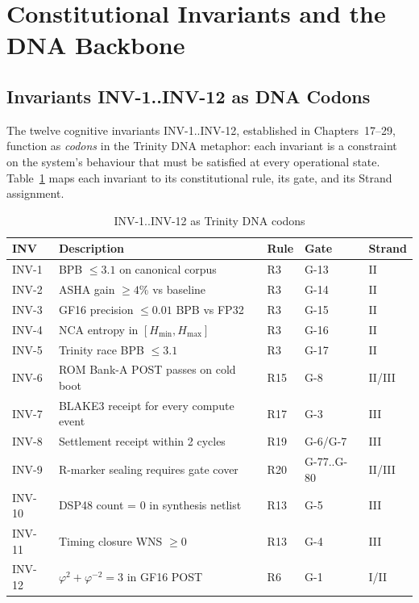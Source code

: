 \section{Constitutional Invariants and the DNA Backbone}
\label{sec74:invariants}

\subsection{Invariants INV-1..INV-12 as DNA Codons}
\label{sec74:inv-codons}

The twelve cognitive invariants INV-1..INV-12, established in Chapters~17--29,
function as \emph{codons} in the Trinity DNA metaphor: each invariant is a
constraint on the system's behaviour that must be satisfied at every operational
state.  Table~\ref{tab74:inv-codons} maps each invariant to its constitutional
rule, its gate, and its Strand assignment.

\begin{table}[H]
\centering
\caption{INV-1..INV-12 as Trinity DNA codons}
\label{tab74:inv-codons}
\small
\begin{tabular}{lllll}
\toprule
INV & Description & Rule & Gate & Strand \\
\midrule
INV-1  & BPB $\leq 3.1$ on canonical corpus          & R3 & G-13 & II \\
INV-2  & ASHA gain $\geq 4\%$ vs baseline            & R3 & G-14 & II \\
INV-3  & GF16 precision $\leq 0.01$ BPB vs FP32     & R3 & G-15 & II \\
INV-4  & NCA entropy in $[H_{\min}, H_{\max}]$      & R3 & G-16 & II \\
INV-5  & Trinity race BPB $\leq 3.1$                & R3 & G-17 & II \\
INV-6  & ROM Bank-A POST passes on cold boot        & R15 & G-8 & II/III \\
INV-7  & BLAKE3 receipt for every compute event     & R17 & G-3 & III \\
INV-8  & Settlement receipt within 2 cycles         & R19 & G-6/G-7 & III \\
INV-9  & R-marker sealing requires gate cover       & R20 & G-77..G-80 & II/III \\
INV-10 & DSP48 count = 0 in synthesis netlist       & R13 & G-5 & III \\
INV-11 & Timing closure WNS $\geq 0$                & R13 & G-4 & III \\
INV-12 & $\varphi^2+\varphi^{-2}=3$ in GF16 POST   & R6  & G-1 & I/II \\
\bottomrule
\end{tabular}
\end{table}

